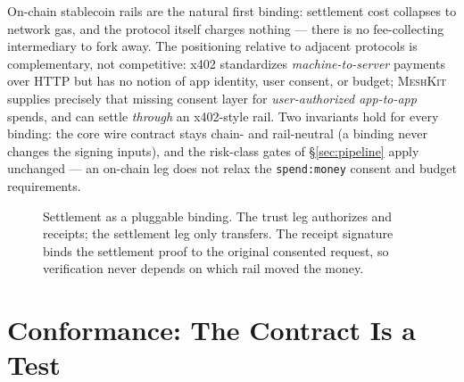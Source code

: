 \documentclass[10pt,twocolumn]{article}
\newcommand{\meshkit}{\textsc{MeshKit}}
\newcommand{\field}[1]{\texttt{#1}}
\begin{document}
On-chain stablecoin rails are the natural first binding: settlement cost
collapses to network gas, and the protocol itself charges nothing --- there
is no fee-collecting intermediary to fork away. The positioning relative
to adjacent protocols is complementary, not competitive: x402 standardizes
\emph{machine-to-server} payments over HTTP but has no notion of app
identity, user consent, or budget; \meshkit{} supplies precisely that
missing consent layer for \emph{user-authorized app-to-app} spends, and
can settle \emph{through} an x402-style rail. Two invariants hold for
every binding: the core wire contract stays chain- and rail-neutral
(a binding never changes the signing inputs), and the risk-class gates of
\S\ref{sec:pipeline} apply unchanged --- an on-chain leg does not relax
the \field{spend:money} consent and budget requirements.

\begin{figure}[t]
\centering
{}
\caption{Settlement as a pluggable binding. The trust leg authorizes and
receipts; the settlement leg only transfers. The receipt signature binds
the settlement proof to the original consented request, so verification
never depends on which rail moved the money.}
\label{fig:settlement}
\end{figure}

\section{Conformance: The Contract Is a Test}
\label{sec:conformance}
\end{document}
